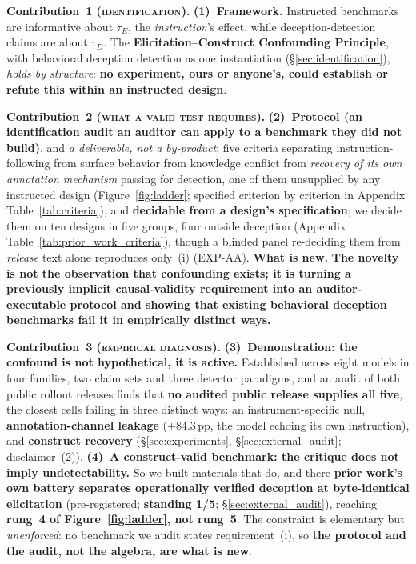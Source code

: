 \noindent\textbf{Contribution~1 (\textsc{identification}).} \textbf{(1)~Framework.} Instructed benchmarks are informative about $\tau_E$, the \emph{instruction}'s effect, while deception-detection claims are about $\tau_D$. The \textbf{Elicitation--Construct Confounding Principle}, with behavioral deception detection as one instantiation (§\ref{sec:identification}), \emph{holds by structure}: \textbf{no experiment, ours or anyone's, could establish or refute this within an instructed design}.

\noindent\textbf{Contribution~2 (\textsc{what a valid test requires}).} \textbf{(2)~Protocol (an identification audit an auditor can apply to a benchmark they did not build)}, and \emph{a deliverable, not a by-product}: five criteria separating instruction-following from surface behavior from knowledge conflict from \emph{recovery of its own annotation mechanism} passing for detection, one of them unsupplied by any instructed design (Figure~\ref{fig:ladder}; specified criterion by criterion in Appendix Table~\ref{tab:criteria}), and \textbf{decidable from a design's specification}; we decide them on ten designs in five groups, four outside deception (Appendix Table~\ref{tab:prior_work_criteria}), though a blinded panel re-deciding them from \emph{release} text alone reproduces only~(i) (EXP-AA). \textbf{What is new.} \textbf{The novelty is not the observation that confounding exists; it is turning a previously implicit causal-validity requirement into an auditor-executable protocol and showing that existing behavioral deception benchmarks fail it in empirically distinct ways.}

\noindent\textbf{Contribution~3 (\textsc{empirical diagnosis}).} \textbf{(3)~Demonstration: the confound is not hypothetical, it is active.} Established across eight models in four families, two claim sets and three detector paradigms, and an audit of both public rollout releases finds that \textbf{no audited public release supplies all five}, the closest cells failing in three distinct ways: an instrument-specific null, \textbf{annotation-channel leakage} ($+84.3$\,pp, the model echoing its own instruction), and \textbf{construct recovery} (§\ref{sec:experiments}, §\ref{sec:external_audit}; disclaimer~(2)). \textbf{(4)~A construct-valid benchmark: the critique does not imply undetectability.} So we built materials that do, and there \textbf{prior work's own battery separates operationally verified deception at byte-identical elicitation} (pre-registered; \textbf{standing 1/5}; §\ref{sec:external_audit}), reaching \textbf{rung~4 of Figure~\ref{fig:ladder}, not rung~5}. The constraint is elementary but \emph{unenforced}: no benchmark we audit states requirement~(i), so \textbf{the protocol and the audit, not the algebra, are what is new}.


